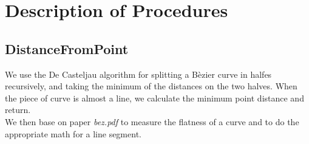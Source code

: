 \documentclass[a4paper,NoNotes,GeneralMath]{stdmdoc}
\begin{document}
	\section*{Description of Procedures}
	\subsection*{DistanceFromPoint}
	We use the De Casteljau algorithm for splitting a Bèzier curve in halfes recursively, and taking the minimum of the
	distances on the two halves. When the piece of curve is almost a line, we calculate the minimum point distance and return. \\
	We then base on paper {\it bez.pdf} to measure the flatness of a curve and to do the appropriate math for a line segment.
\end{document}
